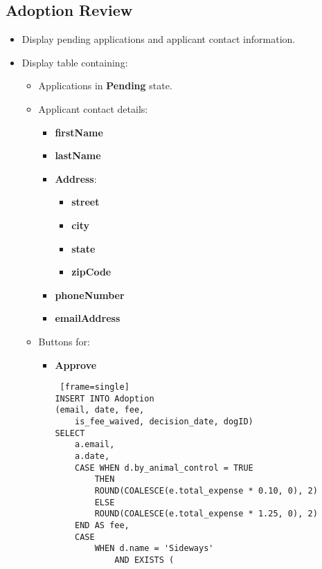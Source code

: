 \documentclass{article}
\begin{document}
\subsection{Adoption Review}
\begin{itemize}
    \item Display pending applications and applicant contact information.
    \item Display table containing:
    \begin{itemize}
        \item Applications in \textbf{Pending} state.
        \item Applicant contact details:
        \begin{itemize}
        \begin{Verbatim} [frame=single]
SELECT 
a.email, 
d.first_name, 
d.last_name, 
d.street, 
d.city, 
d.state, 
d.zip, 
d.phone 
FROM Application a
LEFT JOIN Adopter d ON a.email = d.email;
        \end{Verbatim}
            \item \textbf{firstName}
            \item \textbf{lastName}
            \item \textbf{Address}:
            \begin{itemize}
                \item \textbf{street}
                \item \textbf{city}
                \item \textbf{state}
                \item \textbf{zipCode}
            \end{itemize}
            \item \textbf{phoneNumber}
            \item \textbf{emailAddress}
        \end{itemize}
        \item Buttons for:
        \begin{itemize}
            \item \textbf{Approve}
            \begin{Verbatim} [frame=single]
INSERT INTO Adoption 
(email, date, fee, 
    is_fee_waived, decision_date, dogID)
SELECT 
    a.email, 
    a.date, 
    CASE WHEN d.by_animal_control = TRUE 
        THEN 
        ROUND(COALESCE(e.total_expense * 0.10, 0), 2) 
        ELSE 
        ROUND(COALESCE(e.total_expense * 1.25, 0), 2) 
    END AS fee, 
    CASE 
        WHEN d.name = 'Sideways' 
            AND EXISTS (

\end{Verbatim}
\end{itemize}
\end{itemize}
\end{itemize}
\end{document}
